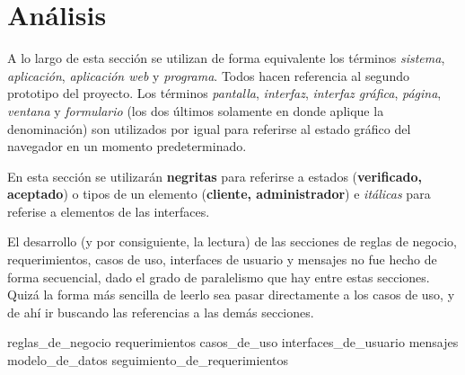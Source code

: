 %
%
%

\section{Análisis}

A lo largo de esta sección se utilizan de forma equivalente los términos
\textit{sistema}, \textit{aplicación}, \textit{aplicación web} y
\textit{programa}. Todos hacen referencia al segundo prototipo del
proyecto. Los términos \textit{pantalla}, \textit{interfaz},
\textit{interfaz gráfica}, \textit{página}, \textit{ventana} y
\textit{formulario} (los dos últimos solamente en donde aplique la
denominación) son utilizados por igual para referirse al estado gráfico
del navegador en un momento predeterminado.

En esta sección se utilizarán \textbf{negritas} para referirse a estados
(\textbf{verificado, aceptado}) o tipos de un elemento
(\textbf{cliente, administrador}) e \textit{itálicas} para referise a elementos
de las interfaces.

El desarrollo (y por consiguiente, la lectura) de las secciones de reglas de
negocio, requerimientos, casos de uso, interfaces de usuario y mensajes no fue
hecho de forma secuencial, dado el grado de paralelismo que hay entre estas
secciones. Quizá la forma más sencilla de leerlo sea pasar directamente a los
casos de uso, y de ahí ir buscando las referencias a las demás secciones.

{reglas_de_negocio}
{requerimientos}
{casos_de_uso}
{interfaces_de_usuario}
{mensajes}
{modelo_de_datos}
{seguimiento_de_requerimientos}
